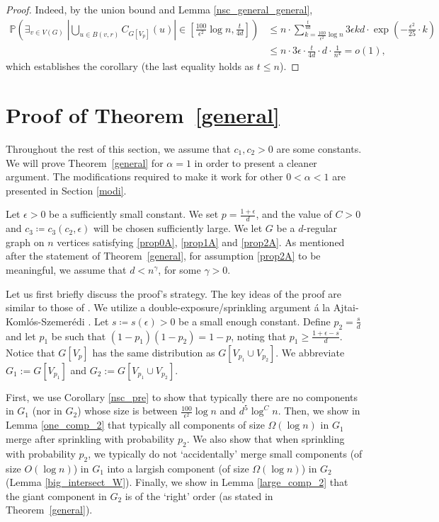 \documentclass[notitlepage]{scrartcl}
\begin{document}
\begin{proof}
    Indeed, by the union bound and Lemma \ref{nsc_general_general},
    \begin{align*}
        \mathbb{P}\left(\exists_{v\in V(G)}\; \left|\bigcup_{u\in B(v,r)} C_{G[V_p]}(u)\right|\in \left[\frac{100}{\epsilon^2}\log n, \frac{t}{4d}\right]\right)&\le n\cdot \sum_{k=\frac{100}{\epsilon^2}\log n}^{\frac{t}{4d}} 3\epsilon kd\cdot \exp\left(-\frac{\epsilon^2}{25}\cdot k\right)\\
        &\le n\cdot 3\epsilon \cdot \frac{t}{4d}\cdot d\cdot \frac{1}{n^4}=o(1),
    \end{align*}
    which establishes the corollary (the last equality holds as $t\le n$). 
\end{proof}

\section{Proof of Theorem~\ref{general}} \label{Pgeneral}

Throughout the rest of this section, we assume that $c_1,c_2>0$ are some constants. We will prove Theorem~\ref{general} for $\alpha=1$ in order to present a cleaner argument. The modifications required to make it work for other $0<\alpha<1$ are presented in Section \ref{modi}. 

Let $\epsilon>0$ be a sufficiently small constant. We set $p=\frac{1+\epsilon}{d}$, and the value of $C>0$ and $c_3\coloneqq c_3(c_2,\epsilon)$ will be chosen sufficiently large. We let $G$ be a $d$-regular graph on $n$ vertices satisfying \ref{prop0A}, \ref{prop1A} and \ref{prop2A}. As mentioned after the statement of Theorem~\ref{general}, for assumption \ref{prop2A} to be meaningful, we assume that $d<n^{\gamma}$, for some $\gamma>0$.

Let us first briefly discuss the proof’s strategy. The key ideas of the proof are similar to those of \cite{zbMATH08098276,diskin2025componentslargesmalli}. We utilize a double-exposure/sprinkling argument \'{a} la Ajtai-Koml\'{o}s-Szemer\'{e}di \cite{zbMATH03769676}. Let $s\coloneqq s(\epsilon)>0$ be a small enough constant. Define $p_2=\frac{s}{d}$ and let $p_1$ be such that $(1-p_1)(1-p_2)=1-p$, noting that $p_1\geq \frac{1+\epsilon-s}{d}$. Notice that $G[V_p]$ has the same distribution as $G[V_{p_1}\cup V_{p_2}]$. We abbreviate $G_1:=G[V_{p_1}]$ and $G_2:=G[V_{p_1}\cup V_{p_2}]$. 

First, we use Corollary \ref{nsc_pre} to show that typically there are no components in $G_1$ (nor in $G_2$) whose size is between $\frac{100}{\epsilon^2}\log n$ and $d^5\log^C n$.
Then, we show in Lemma \ref{one_comp_2} that typically all components of size $\Omega(\log n)$ in $G_1$ merge after sprinkling with probability $p_2$.
We also show that when sprinkling with probability $p_2$, we typically do not ‘accidentally’ merge small components (of size $O(\log n)$) in $G_1$ into a largish component (of size $\Omega(\log n)$) in $G_2$ (Lemma \ref{big_intersect_W}). Finally, we show in Lemma \ref{large_comp_2} that the giant component in $G_2$ is of the `right' order (as stated in Theorem~\ref{general}).
\end{document}
